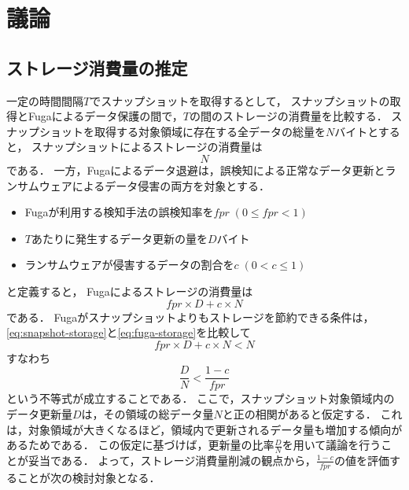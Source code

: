 \chapter{議論}
\label{chap:discussion}

\section{ストレージ消費量の推定}
一定の時間間隔$T$でスナップショットを取得するとして，
スナップショットの取得とFugaによるデータ保護の間で，$T$の間のストレージの消費量を比較する．
スナップショットを取得する対象領域に存在する全データの総量を$N$バイトとすると，
スナップショットによるストレージの消費量は
\begin{equation}
  \label{eq:snapshot-storage}
  N
\end{equation}
である．
一方，Fugaによるデータ退避は，誤検知による正常なデータ更新とランサムウェアによるデータ侵害の両方を対象とする．
\begin{itemize}
  \item Fugaが利用する検知手法の誤検知率を$fpr \;(0 \le fpr < 1)$
  \item $T$あたりに発生するデータ更新の量を$D$バイト
  \item ランサムウェアが侵害するデータの割合を$c \; (0 < c \le 1)$
\end{itemize}
と定義すると，
Fugaによるストレージの消費量は
\begin{equation}
  \label{eq:fuga-storage}
  fpr \times D + c \times N
\end{equation}
である．
Fugaがスナップショットよりもストレージを節約できる条件は，\eqref{eq:snapshot-storage}と\eqref{eq:fuga-storage}を比較して
\begin{equation}
  fpr \times D + c \times N < N
\end{equation}
すなわち
\begin{equation}
  \label{eq:storage-compare}
  \frac{D}{N} < \frac{1-c}{fpr}
\end{equation}
という不等式が成立することである．
ここで，スナップショット対象領域内のデータ更新量$D$は，その領域の総データ量$N$と正の相関があると仮定する．
これは，対象領域が大きくなるほど，領域内で更新されるデータ量も増加する傾向があるためである．
この仮定に基づけば，更新量の比率$\frac{D}{N}$を用いて議論を行うことが妥当である．
よって，ストレージ消費量削減の観点から，$\frac{1-c}{fpr}$の値を評価することが次の検討対象となる．


